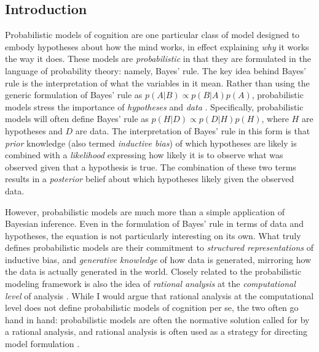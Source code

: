 \documentclass[12pt]{article}
\begin{document}

\subsection*{Introduction}

Probabilistic models of cognition are one particular class of model designed to embody hypotheses about how the mind works, in effect explaining \textit{why} it works the way it does.
These models are \textit{probabilistic} in that they are formulated in the language of probability theory: namely, Bayes' rule.
The key idea behind Bayes' rule is the interpretation of what the variables in it mean.
Rather than using the generic formulation of Bayes' rule as $p(A|B)\propto p(B|A)p(A)$, probabilistic models stress the importance of \textit{hypotheses} and \textit{data} \citep{Griffiths2010,Tenenbaum2011}.
Specifically, probabilistic models will often define Bayes' rule as $p(H|D)\propto p(D|H)p(H)$, where $H$ are hypotheses and $D$ are data.
The interpretation of Bayes' rule in this form is that \textit{prior} knowledge (also termed \textit{inductive bias}) of which hypotheses are likely is combined with a \textit{likelihood} expressing how likely it is to observe what was observed given that a hypothesis is true.
The combination of these two terms results in a \textit{posterior} belief about which hypotheses likely given the observed data.

However, probabilistic models are much more than a simple application of Bayesian inference.
Even in the formulation of Bayes' rule in terms of data and hypotheses, the equation is not particularly interesting on its own.
What truly defines probabilistic models are their commitment to \textit{structured representations} of inductive bias, and \textit{generative knowledge} of how data is generated, mirroring how the data is actually generated in the world.
Closely related to the probabilistic modeling framework is also the idea of \textit{rational analysis} \citep{Anderson1990} at the \textit{computational level} of analysis \citep{Marr1971}.
While I would argue that rational analysis at the computational level does not define probabilistic models of cognition per se, the two often go hand in hand: probabilistic models are often the normative solution called for by a rational analysis, and rational analysis is often used as a strategy for directing model formulation \cite{Jacobs2011}.
\end{document}
